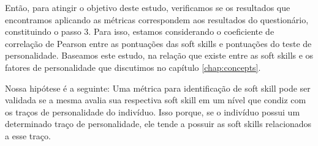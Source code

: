 Então, para atingir o objetivo deste estudo, verificamos se os resultados que encontramos aplicando as métricas correspondem aos resultados do questionário, constituindo o passo 3.
Para isso, estamos considerando o coeficiente de correlação de Pearson entre as pontuações das soft skills e pontuações do teste de personalidade.
Baseamos este estudo, na relação que existe entre as soft skills e os fatores de personalidade que discutimos no capítulo \ref{chap:concepts}.

Nossa hipótese é a seguinte: Uma métrica para identificação de soft skill pode ser validada se a mesma avalia sua respectiva soft skill em um nível que condiz com os traços de personalidade do indivíduo. Isso porque, se o indivíduo possui um determinado traço de personalidade, ele tende a possuir as soft skills relacionados a esse traço.
